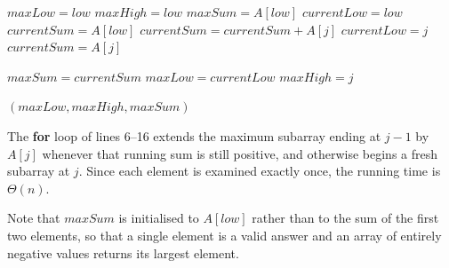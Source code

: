 \begin{algorithmic}[1]
  \STATE $\mathit{maxLow} = \mathit{low}$
  \STATE $\mathit{maxHigh} = \mathit{low}$
  \STATE $\mathit{maxSum} = A[\mathit{low}]$
  \STATE $\mathit{currentLow} = \mathit{low}$
  \STATE $\mathit{currentSum} = A[\mathit{low}]$
  \STATE $\mathit{currentSum} = \mathit{currentSum} + A[j]$
  \ELSE
  \STATE $\mathit{currentLow} = j$
  \STATE $\mathit{currentSum} = A[j]$
  \ENDIF

  \STATE $\mathit{maxSum} = \mathit{currentSum}$
  \STATE $\mathit{maxLow} = \mathit{currentLow}$
  \STATE $\mathit{maxHigh} = j$
  \ENDIF
  \ENDFOR

  \RETURN $(\mathit{maxLow}, \mathit{maxHigh}, \mathit{maxSum})$
\end{algorithmic}

The \textbf{for} loop of lines 6--16 extends the maximum subarray ending at
$j - 1$ by $A[j]$ whenever that running sum is still positive, and otherwise
begins a fresh subarray at $j$. Since each element is examined exactly once,
the running time is $\Theta(n)$.

Note that $\mathit{maxSum}$ is initialised to $A[\mathit{low}]$ rather than to
the sum of the first two elements, so that a single element is a valid answer
and an array of entirely negative values returns its largest element.
